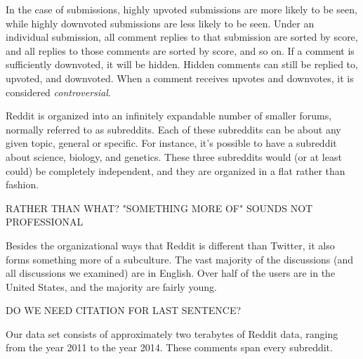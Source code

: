 In the case of submissions, highly upvoted submissions are more likely to be seen, while highly downvoted submissions are less likely to be seen. Under an individual submission, all comment replies to that submission are sorted by score, and all replies to those comments are sorted by score, and so on. If a comment is sufficiently downvoted, it will be hidden. Hidden comments can still be replied to, upvoted, and downvoted. When a comment receives upvotes and downvotes, it is considered \textit{controversial}.  

Reddit is organized into an infinitely expandable number of smaller forums, normally referred to as subreddits. Each of these subreddits can be about any given topic, general or specific. For instance, it's possible to have a subreddit about science, biology, and genetics. These three subreddits would (or at least could) be completely independent, and they are organized in a flat rather than fashion.

RATHER THAN WHAT?
"SOMETHING MORE OF" SOUNDS NOT PROFESSIONAL

Besides the organizational ways that Reddit is different than Twitter, it also forms something more of a subculture. The vast majority of the discussions (and all discussions we examined) are in English. Over half of the users are in the United States, and the majority are fairly young. 

DO WE NEED CITATION FOR LAST SENTENCE?

Our data set consists of approximately two terabytes of Reddit data, ranging from the year 2011 to the year 2014. These comments span every subreddit. 

